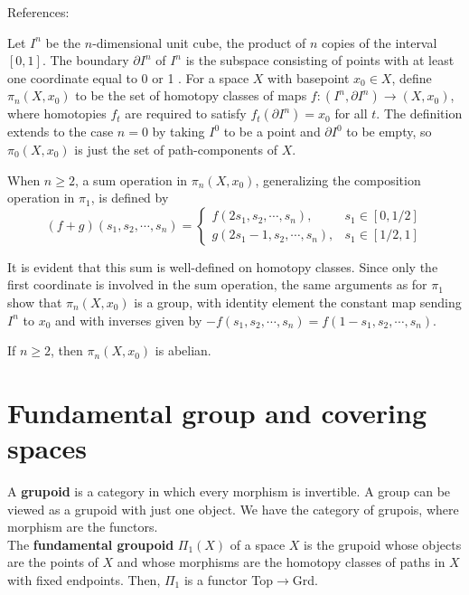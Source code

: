 References: \cite{mayConciseCourseAlgebraic1999}

Let $I^n$ be the $n$-dimensional unit cube, the product of $n$ copies of the interval $[0,1]$. The boundary $\partial I^n$ of $I^n$ is the subspace consisting of points with at least one coordinate equal to 0 or 1 . For a space $X$ with basepoint $x_0 \in X$, define $\pi_n\left(X, x_0\right)$ to be the set of homotopy classes of maps $f:\left(I^n, \partial I^n\right) \rightarrow\left(X, x_0\right)$, where homotopies $f_t$ are required to satisfy $f_t\left(\partial I^n\right)=x_0$ for all $t$. The definition extends to the case $n=0$ by taking $I^0$ to be a point and $\partial I^0$ to be empty, so $\pi_0\left(X, x_0\right)$ is just the set of path-components of $X$.

When $n \geq 2$, a sum operation in $\pi_n\left(X, x_0\right)$, generalizing the composition operation in $\pi_1$, is defined by
$$
(f+g)\left(s_1, s_2, \cdots, s_n\right)= \begin{cases}f\left(2 s_1, s_2, \cdots, s_n\right), & s_1 \in[0,1 / 2] \\ g\left(2 s_1-1, s_2, \cdots, s_n\right), & s_1 \in[1 / 2,1]\end{cases}
$$

It is evident that this sum is well-defined on homotopy classes. Since only the first coordinate is involved in the sum operation, the same arguments as for $\pi_1$ show that $\pi_n\left(X, x_0\right)$ is a group, with identity element the constant map sending $I^n$ to $x_0$ and with inverses given by $-f\left(s_1, s_2, \cdots, s_n\right)=f\left(1-s_1, s_2, \cdots, s_n\right)$.


\begin{prop}
    If $n \geq 2$, then $\pi_n\left(X, x_0\right)$ is abelian.
\end{prop}


\section{Fundamental group and covering spaces}

A \textbf{grupoid} is a category in which every morphism is invertible. A group can be viewed as a grupoid with just one object. We have the category of grupois, where morphism are the functors.\\
The \textbf{fundamental groupoid} $\Pi_1(X)$ of a space $X$ is the grupoid whose objects are the points of $X$ and whose morphisms are the homotopy classes of paths in $X$ with fixed endpoints. Then, $\Pi_1$ is a functor Top$\rightarrow$Grd.\\

